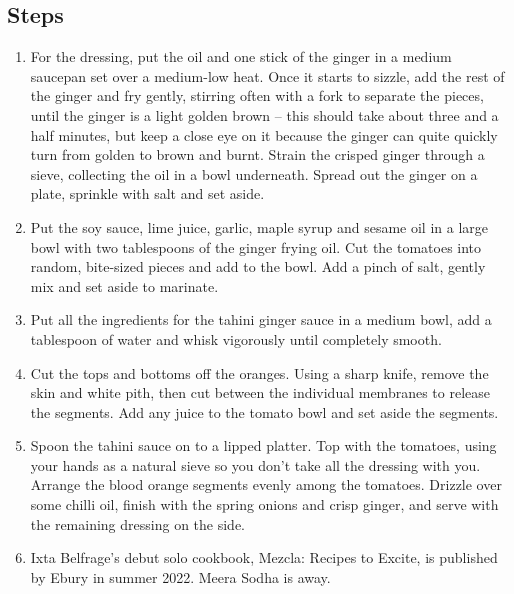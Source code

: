 \documentclass{book}
\begin{document}
\subsection*{Steps}
\begin{enumerate}
\item For the dressing, put the oil and one stick of the ginger in a medium saucepan set over a medium-low heat. Once it starts to sizzle, add the rest of the ginger and fry gently, stirring often with a fork to separate the pieces, until the ginger is a light golden brown – this should take about three and a half minutes, but keep a close eye on it because the ginger can quite quickly turn from golden to brown and burnt. Strain the crisped ginger through a sieve, collecting the oil in a bowl underneath. Spread out the ginger on a plate, sprinkle with salt and set aside.
\item Put the soy sauce, lime juice, garlic, maple syrup and sesame oil in a large bowl with two tablespoons of the ginger frying oil. Cut the tomatoes into random, bite-sized pieces and add to the bowl. Add a pinch of salt, gently mix and set aside to marinate.
\item Put all the ingredients for the tahini ginger sauce in a medium bowl, add a tablespoon of water and whisk vigorously until completely smooth.
\item Cut the tops and bottoms off the oranges. Using a sharp knife, remove the skin and white pith, then cut between the individual membranes to release the segments. Add any juice to the tomato bowl and set aside the segments.
\item Spoon the tahini sauce on to a lipped platter. Top with the tomatoes, using your hands as a natural sieve so you don’t take all the dressing with you. Arrange the blood orange segments evenly among the tomatoes. Drizzle over some chilli oil, finish with the spring onions and crisp ginger, and serve with the remaining dressing on the side.
\item  Ixta Belfrage’s debut solo cookbook, Mezcla: Recipes to Excite, is published by Ebury in summer 2022. Meera Sodha is away.
\end{enumerate}
\newpage
\end{document}
